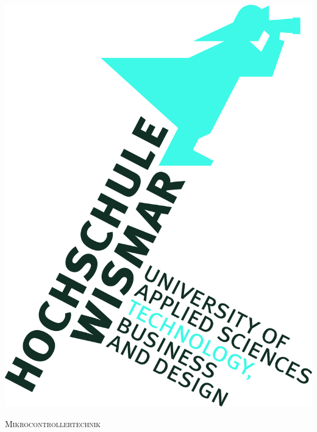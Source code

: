 \documentclass[12pt]{article}
\begin{document}
\begin{titlepage}

\newcommand{\HRule}{\rule{\linewidth}{0.5mm}} %

\center %


\noindent\begin{minipage}[t][0.3819660112501052\paperheight][t]{\textwidth}
\centering
\vspace{0.09016994374947421\paperheight}
\includegraphics[scale=0.09016994374947421]{logo.jpg}
\end{minipage}

\textsc{\Large Mikrocontrollertechnik}\\[0.5cm] %


\end{titlepage}
\end{document}
